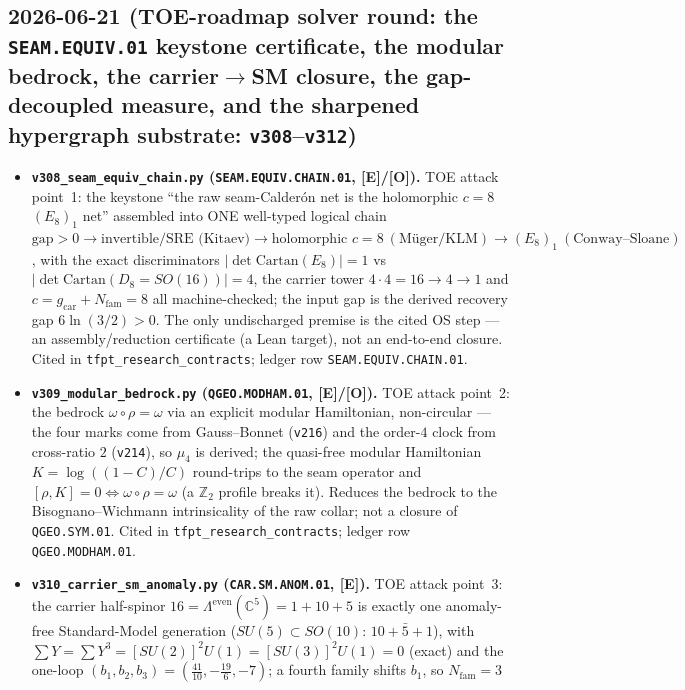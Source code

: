 \documentclass[11pt]{article}
\providecommand{\mE}{\textbf{[E]}}\providecommand{\mC}{\textbf{[C]}}
\providecommand{\mO}{\textbf{[O]}}\providecommand{\mX}{\textbf{[X]}}
\providecommand{\gcar}{g_{\mathrm{car}}}\providecommand{\Nfam}{N_{\mathrm{fam}}}
\begin{document}
\subsection*{2026-06-21 (TOE-roadmap solver round: the \texttt{SEAM.EQUIV.01} keystone certificate, the modular bedrock, the carrier$\to$SM closure, the gap-decoupled measure, and the sharpened hypergraph substrate: \texttt{v308}--\texttt{v312})}
\begin{itemize}
\item \textbf{\texttt{v308\_seam\_equiv\_chain.py} (\texttt{SEAM.EQUIV.CHAIN.01}, \mE/\mO).} TOE attack point~1:
  the keystone ``the raw seam-Calder\'on net is the holomorphic $c{=}8$ $(E_8)_1$ net'' assembled into ONE
  well-typed logical chain $\text{gap}{>}0\to\text{invertible/SRE (Kitaev)}\to\text{holomorphic }c{=}8\
  (\text{M\"uger/KLM})\to(E_8)_1\ (\text{Conway--Sloane})$, with the exact discriminators
  $|\det\mathrm{Cartan}(E_8)|{=}1$ vs $|\det\mathrm{Cartan}(D_8{=}SO(16))|{=}4$, the carrier tower
  $4{\cdot}4{=}16\to4\to1$ and $c{=}\gcar{+}\Nfam{=}8$ all machine-checked; the input gap is the derived recovery gap
  $6\ln(3/2){>}0$. The only undischarged premise is the cited OS step --- an assembly/reduction certificate (a Lean
  target), not an end-to-end closure. Cited in \texttt{tfpt\_research\_contracts}; ledger row \texttt{SEAM.EQUIV.CHAIN.01}.
\item \textbf{\texttt{v309\_modular\_bedrock.py} (\texttt{QGEO.MODHAM.01}, \mE/\mO).} TOE attack point~2: the bedrock
  $\omega{\circ}\rho{=}\omega$ via an explicit modular Hamiltonian, non-circular --- the four marks come from
  Gauss--Bonnet (\texttt{v216}) and the order-$4$ clock from cross-ratio $2$ (\texttt{v214}), so $\mu_4$ is derived;
  the quasi-free modular Hamiltonian $K=\log((1{-}C)/C)$ round-trips to the seam operator and $[\rho,K]{=}0
  \Leftrightarrow\omega{\circ}\rho{=}\omega$ (a $\mathbb Z_2$ profile breaks it). Reduces the bedrock to the
  Bisognano--Wichmann intrinsicality of the raw collar; not a closure of \texttt{QGEO.SYM.01}. Cited in
  \texttt{tfpt\_research\_contracts}; ledger row \texttt{QGEO.MODHAM.01}.
\item \textbf{\texttt{v310\_carrier\_sm\_anomaly.py} (\texttt{CAR.SM.ANOM.01}, \mE).} TOE attack point~3: the carrier
  half-spinor $16=\Lambda^{\mathrm{even}}(\mathbb C^5)=1{+}10{+}5$ is exactly one anomaly-free Standard-Model
  generation ($SU(5)\subset SO(10)$: $10{+}\bar5{+}1$), with $\sum Y=\sum Y^3=[SU(2)]^2U(1)=[SU(3)]^2U(1)=0$ (exact)
  and the one-loop $(b_1,b_2,b_3)=(\tfrac{41}{10},-\tfrac{19}{6},-7)$; a fourth family shifts $b_1$, so $\Nfam{=}3$

\end{itemize}
\end{document}
